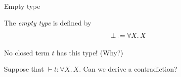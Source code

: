 %  

\begin{frame}{Empty type}
  \begin{definition}
    The \emph{empty type} is defined by
    \[
      \bot \defeq \forall X.\, X
    \]
  \end{definition}
  \vfill
  No closed term $t$ has this type! (Why?)
\begin{exercise*}
  Suppose that $\vdash t : \forall X.\, X$.
  Can we derive a contradiction?
\end{exercise*}
\end{frame}

